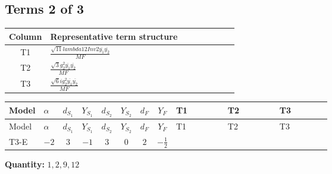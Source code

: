 \documentclass[8pt]{article}
\begin{document}
\begin{landscape}
\subsection*{Terms 2 of 3}
\begin{center}
\begin{tabular}{@{}c >{\raggedright\arraybackslash}p{0.82\linewidth}@{}}
\toprule
Column & Representative term structure \\
\midrule
T1 & \(\displaystyle \frac{\sqrt{11} lambda12Inv2 \overline{y_{1}} \overline{y_{2}}}{MF}\) \\
\midrule
T2 & \(\displaystyle \frac{\sqrt{3} g_{2}^{2} \overline{y_{1}} \overline{y_{2}}}{MF}\) \\
\midrule
T3 & \(\displaystyle \frac{\sqrt{6} i g_{2}^{2} \overline{y_{1}} \overline{y_{2}}}{MF}\) \\
\midrule
\bottomrule
\end{tabular}
\end{center}
\smallskip
\tiny
\begin{longtable}{@{}llcccccc >{\raggedright\arraybackslash}p{0.21\linewidth} >{\raggedright\arraybackslash}p{0.21\linewidth} >{\raggedright\arraybackslash}p{0.21\linewidth}@{}}
\toprule
Model & $\alpha$ & $d_{S_1}$ & $Y_{S_1}$ & $d_{S_2}$ & $Y_{S_2}$ & $d_F$ & $Y_F$ & T1 & T2 & T3 \\
\midrule
\endfirsthead
\toprule
Model & $\alpha$ & $d_{S_1}$ & $Y_{S_1}$ & $d_{S_2}$ & $Y_{S_2}$ & $d_F$ & $Y_F$ & T1 & T2 & T3 \\
\midrule
\endhead
T3-E & $-2$ & $3$ & $-1$ & $3$ & $0$ & $2$ & $-\frac{1}{2}$ & \scriptsize\adjustbox{max width=\linewidth}{$\begin{gathered} \frac{3 \sqrt{11} lambda12Inv2 \overline{y_{1}} \overline{y_{2}}}{22 MF}\end{gathered}$} & \scriptsize\adjustbox{max width=\linewidth}{$\begin{gathered} \frac{15 \sqrt{3} g_{2}^{2} \overline{y_{1}} \overline{y_{2}}}{8 MF}\end{gathered}$} & \scriptsize\adjustbox{max width=\linewidth}{$\begin{gathered} - \frac{\sqrt{6} i g_{2}^{2} \overline{y_{1}} \overline{y_{2}}}{6 MF}\end{gathered}$} \\
\midrule
\bottomrule
\end{longtable}
\clearpage
\noindent\textbf{Quantity: }$\mathrm{1,2,9,12}$\par\smallskip

\end{landscape}
\end{document}
